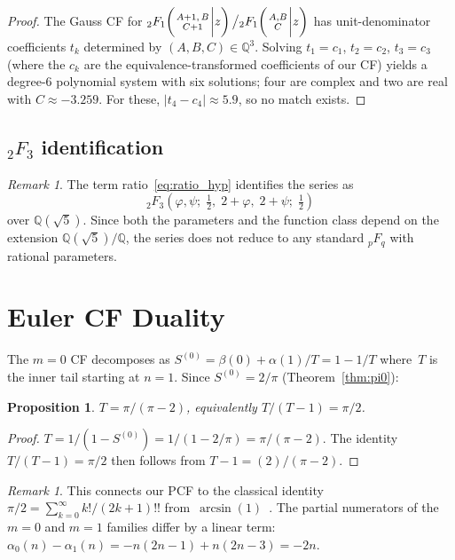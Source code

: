 \documentclass[11pt,a4paper]{article}
\theoremstyle{plain}
\newtheorem{proposition}[theorem]{Proposition}
\theoremstyle{definition}
\theoremstyle{remark}
\newtheorem{remark}[theorem]{Remark}
\newcommand{\half}{\tfrac{1}{2}}
\newcommand{\dff}[1]{(#1)!!}
\newcommand{\hyp}[5]{{{}_{#1}F_{#2}}\!\left(\genfrac{}{}{0pt}{}{#3}{#4}\bigg|#5\right)}
\begin{document}
\begin{proof}
The Gauss CF for
$\hyp21{A{+}1,\,B}{C{+}1}{z}\big/\hyp21{A,B}{C}{z}$
has unit-denominator coefficients $t_k$ determined by
$(A,B,C)\in\mathbb{Q}^3$.
Solving $t_1=c_1$, $t_2=c_2$, $t_3=c_3$ (where the $c_k$ are the
equivalence-transformed coefficients of our CF) yields a degree-6
polynomial system with six solutions; four are complex and two are
real with $C \approx -3.259$.
For these,
$|t_4 - c_4| \approx 5.9$, so no match exists.
\end{proof}

\subsection{\texorpdfstring{${}_2F_3$}{2F3} identification}

\begin{remark}\label{rem:2f3}
The term ratio~\eqref{eq:ratio_hyp} identifies the series as
\[
  {}_2F_3\!\left(\varphi,\psi;\;\half,\;2{+}\varphi,\;2{+}\psi;\;
  \half\right)
\]
over $\mathbb{Q}(\sqrt5)$.
Since both the parameters and the function class depend on the
extension $\mathbb{Q}(\sqrt5)/\mathbb{Q}$, the series does not
reduce to any standard ${}_pF_q$ with rational parameters.
\end{remark}

\section{Euler CF Duality}\label{sec:euler}

The $m=0$ CF decomposes as
$S^{(0)} = \beta(0) + \alpha(1)/T = 1 - 1/T$
where~$T$ is the inner tail starting at $n = 1$.
Since $S^{(0)} = 2/\pi$ (Theorem~\ref{thm:pi0}):

\begin{proposition}\label{prop:euler}
$T = \pi/(\pi - 2)$, equivalently
$T/(T{-}1) = \pi/2$.
\end{proposition}

\begin{proof}
$T = 1/(1 - S^{(0)}) = 1/(1 - 2/\pi) = \pi/(\pi - 2)$.
The identity $T/(T{-}1) = \pi/2$ then follows from
$T - 1 = (2)/(\pi - 2)$.
\end{proof}

\begin{remark}
This connects our PCF to the classical identity
$\pi/2 = \sum_{k=0}^{\infty} k!/\dff{2k{+}1}$
from~$\arcsin(1)$~\cite[\S4.24.2]{dlmf}.
The partial numerators of the $m=0$ and $m=1$ families differ
by a linear term:
$\alpha_0(n) - \alpha_1(n) = -n(2n{-}1) + n(2n{-}3) = -2n$.
\end{remark}
\end{document}

